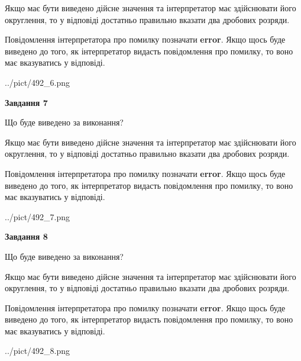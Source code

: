 \documentclass[12pt, ukrainian]{article}
\begin{document}
{\begin {Large}
Якщо має бути виведено дійсне значення та інтерпретатор має здійснювати його округлення, 
то у відповіді достатньо правильно вказати два дробових розряди.

Повідомлення інтерпретатора про помилку позначати \textbf{error}.
Якщо щось буде виведено до того, як інтерпретатор видасть повідомлення про помилку, 
то воно має вказуватись у відповіді. \par

\begin{center}
	{../pict/492_6.png}
\end{center}
\newpage

{\begin {center}\textbf{Завдання 7}\end {center}}\par
Що буде виведено за виконання? \par

Якщо має бути виведено дійсне значення та інтерпретатор має здійснювати його округлення, 
то у відповіді достатньо правильно вказати два дробових розряди.

Повідомлення інтерпретатора про помилку позначати \textbf{error}.
Якщо щось буде виведено до того, як інтерпретатор видасть повідомлення про помилку, 
то воно має вказуватись у відповіді. \par

\begin{center}
	{../pict/492_7.png}
\end{center}
\newpage

{\begin {center}\textbf{Завдання 8}\end {center}}\par
Що буде виведено за виконання? \par

Якщо має бути виведено дійсне значення та інтерпретатор має здійснювати його округлення, 
то у відповіді достатньо правильно вказати два дробових розряди.

Повідомлення інтерпретатора про помилку позначати \textbf{error}.
Якщо щось буде виведено до того, як інтерпретатор видасть повідомлення про помилку, 
то воно має вказуватись у відповіді. \par

\begin{center}
	{../pict/492_8.png}
\end{center}
\newpage


\end{Large}}
\end{document}
